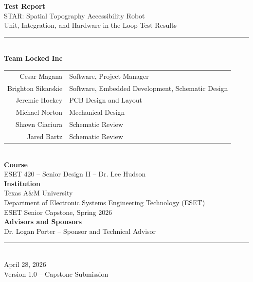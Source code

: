 \documentclass[11pt,letterpaper]{article}
\begin{document}
\thispagestyle{empty}

\begin{center}
\vspace*{1.0in}
{\Huge \bfseries Test Report}\\[0.35in]
{\LARGE STAR: Spatial Topography Accessibility Robot}\\[0.20in]
{\large Unit, Integration, and Hardware-in-the-Loop Test Results}\\[0.8in]

\rule{4.5in}{0.8pt}\\[0.3in]

{\large \textbf{Team Locked Inc}}\\[0.15in]
\begin{tabular}{r l}
Cesar Magana        & Software, Project Manager \\
Brighton Sikarskie  & Software, Embedded Development, Schematic Design \\
Jeremie Hockey      & PCB Design and Layout \\
Michael Norton      & Mechanical Design \\
Shawn Ciaciura      & Schematic Review \\
Jared Bartz         & Schematic Review \\
\end{tabular}\\[0.4in]

{\large \textbf{Course}}\\[0.1in]
{\normalsize ESET 420 -- Senior Design II -- Dr. Lee Hudson}\\[0.4in]

{\large \textbf{Institution}}\\[0.1in]
{\normalsize Texas A\&M University}\\
{\normalsize Department of Electronic Systems Engineering Technology (ESET)}\\
{\normalsize ESET Senior Capstone, Spring 2026}\\[0.4in]

{\large \textbf{Advisors and Sponsors}}\\[0.1in]
{\normalsize Dr. Logan Porter -- Sponsor and Technical Advisor}\\[0.6in]

\rule{4.5in}{0.8pt}\\[0.2in]
{\large April 28, 2026}\\[0.15in]
{\small Version 1.0 -- Capstone Submission}

\end{center}
\clearpage
\end{document}
